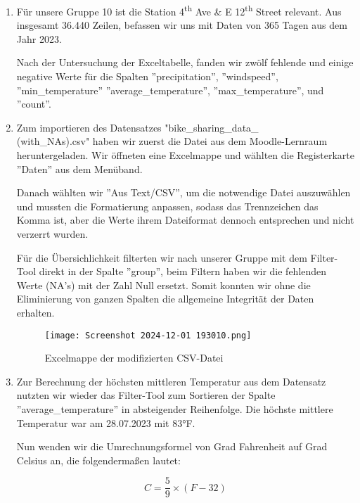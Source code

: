 \documentclass[11pt]{article}
\begin{document}
\begin{enumerate}
    \item Für unsere Gruppe 10 ist die Station 4\textsuperscript{th} Ave \& E 12\textsuperscript{th} Street relevant. Aus insgesamt 36.440 Zeilen, befassen wir uns mit Daten von 365 Tagen aus dem Jahr 2023.

    Nach der Untersuchung der Exceltabelle, fanden wir zwölf fehlende und einige negative Werte für die Spalten ''precipitation'', ''windspeed'', \\ ''min\_temperature'' ''average\_temperature'', ''max\_temperature'', und \\ ''count''.

    \item 
    Zum importieren des Datensatzes "bike\_sharing\_data\_ \\(with\_NAs).csv" haben wir zuerst die Datei aus dem Moodle-Lernraum heruntergeladen. Wir öffneten eine Excelmappe und wählten die Registerkarte ''Daten'' aus dem Menüband.
    
    Danach wählten wir ''Aus Text/CSV'', um die notwendige Datei auszuwählen und mussten die Formatierung anpassen, sodass das Trennzeichen das Komma ist, aber die Werte ihrem Dateiformat dennoch entsprechen und nicht verzerrt wurden.
    
    Für die Übersichlichkeit filterten wir nach unserer Gruppe mit dem Filter-Tool direkt in der Spalte ''group'', beim Filtern haben wir die fehlenden Werte (NA's) mit der Zahl Null ersetzt. Somit konnten wir ohne die Eliminierung von ganzen Spalten die allgemeine Integrität der Daten erhalten.

    \begin{figure}[H]
        \centering
        \texttt{[image: Screenshot 2024-12-01 193010.png]}
        \caption{Excelmappe der modifizierten CSV-Datei}
        \label{fig:first-figure}
    \end{figure}
    
    \item Zur Berechnung der höchsten mittleren Temperatur aus dem Datensatz nutzten wir wieder das Filter-Tool zum Sortieren der Spalte \\''average\_temperature'' in absteigender Reihenfolge. Die höchste mittlere Temperatur war am 28.07.2023 mit 83°F. 
    
    Nun wenden wir die Umrechnungsformel von Grad Fahrenheit auf Grad Celsius an, die folgendermaßen lautet: 
    
\[C = \frac{5}{9} \times (F - 32) \]


\end{enumerate}
\end{document}
